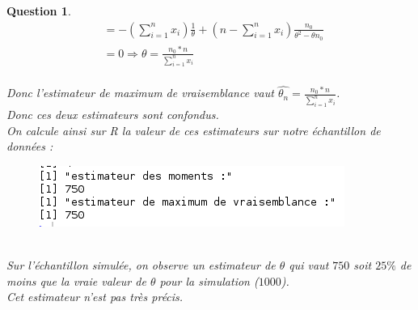 \documentclass[a4paper,11pt]{article}
\newtheorem{exo1}{Question}
\begin{document}
\begin{exo1}
\begin{equation}
\begin{aligned}
& = -(\sum_{i=1}^{n} x_{i})\frac{1}{\theta}+(n-\sum_{i=1}^{n} x_{i})\frac{n_{0}}{\theta^{2}-\theta n_{0}} \ \\
& = 0 \Rightarrow \theta=\frac{n_{0}*n}{\sum_{i=1}^{n} x_{i}}
\end{aligned}
\end{equation} \ \\
Donc l'estimateur de maximum de vraisemblance vaut $\hat{\theta_{n}}=\frac{n_{0}*n}{\sum_{i=1}^{n} x_{i}}$. \ \\
Donc ces deux estimateurs sont confondus. \ \\
On calcule ainsi sur R la valeur de ces estimateurs sur notre échantillon de données : \ \\
\begin{figure}[h]
\includegraphics[scale=0.7]{images/Q1_3.png}
\end{figure} \ \\
Sur l'échantillon simulée, on observe un estimateur de $\theta$ qui vaut $750$ soit $25\%$ de moins que la vraie valeur de $\theta$ pour la simulation ($1000$). \ \\
Cet estimateur n'est pas très précis.
\end{exo1}
\end{document}
